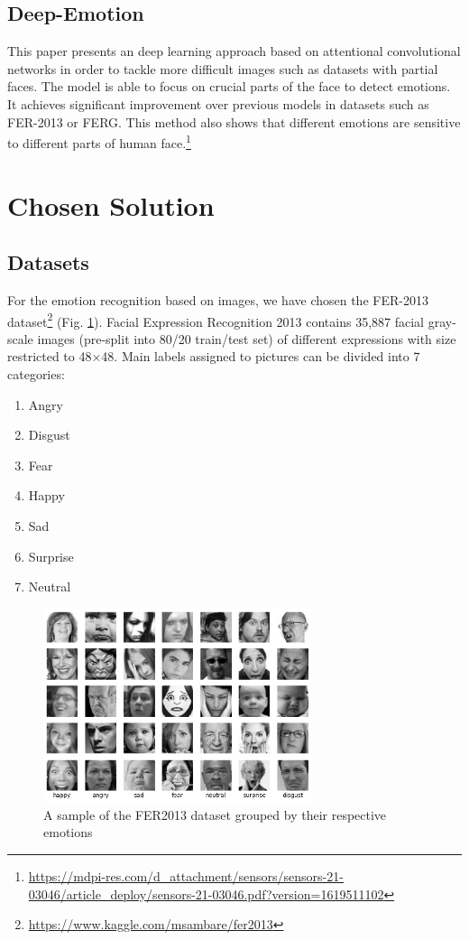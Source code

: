 \documentclass{ledger}
\begin{document}
\subsection{Deep-Emotion}
This paper presents an deep learning approach based on attentional convolutional networks in order to tackle more difficult images such as datasets with partial faces. The model is able to focus on crucial parts of the face to detect emotions. It achieves significant improvement over previous models in datasets such as FER-2013 or FERG. This method also shows that different emotions are sensitive to different parts of human face.\footnote[2]{\url{https://mdpi-res.com/d_attachment/sensors/sensors-21-03046/article_deploy/sensors-21-03046.pdf?version=1619511102}}

\section{Chosen Solution}

\subsection{Datasets}

For the emotion recognition based on images, we have chosen the FER-2013 dataset\footnote{\url{https://www.kaggle.com/msambare/fer2013}} (Fig. \ref{fig:fer2013}). Facial Expression Recognition 2013 contains 35,887 facial gray-scale images (pre-split into 80/20 train/test set) of different expressions with size restricted to 48×48. Main labels assigned to pictures can be divided into 7 categories:

\begin{enumerate}
	\item Angry
	\item Disgust
	\item Fear
	\item Happy
	\item Sad
	\item Surprise
	\item Neutral
\end{enumerate}

\begin{figure}[H]
	\centering
	\includegraphics[width=0.7\textwidth]{assets/fer2013.png}
	\caption{A sample of the FER2013 dataset grouped by their respective emotions}
	\label{fig:fer2013}
\end{figure}
\end{document}
